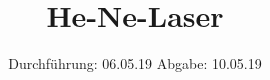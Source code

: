 

\subject{V61}
\title{He-Ne-Laser}
\date{
  Durchführung: 06.05.19
  \hspace{3em}
  Abgabe: 10.05.19
}



\maketitle
\thispagestyle{empty}
\tableofcontents
\newpage




%



\newpage
\printbibliography


